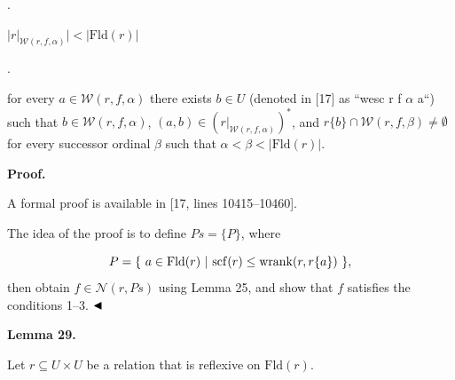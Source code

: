 \documentclass[10pt,a4paper]{amsart}
\begin{document}
 
 
\par{}. 
 
$|r|_{\mathcal{W}(r,f,\alpha)}|<|\mathrm{Fld}(r)|$\par
 
 
 
\par{}. 
 
for every $a\in\mathcal{W}(r,f,\alpha)$ there exists $b\in U$ (denoted in [17] as “wesc r f $\alpha$ a“) such that $b\in\mathcal{W}(r,f,\alpha)$, $(a,b)\in(r|_{\mathcal{W}(r,f,\alpha)})^{*}$, and $r\{b\}\cap\mathcal{W}(r,f,\beta)\neq\emptyset$ for every successor ordinal $\beta$ such that $\alpha<\beta<|\mathrm{Fld}(r)|$.\par
 
 
  
 
 
 
\par\medskip\noindent\textbf{Proof.}\par
 
 
A formal proof is available in [17, lines 10415–10460].\par
 
 
 
The idea of the proof is to define $Ps=\{P\}$, where\par
    \[P=\{\leavevmode\nobreak\ a\in\mathrm{Fld}(r)\leavevmode\nobreak\ |\leavevmode%
\nobreak\ \mathrm{scf}(r)\leq\mathrm{wrank}(r,r\{a\})\leavevmode\nobreak\ \},\]    
then obtain $f\in\mathcal{N}(r,Ps)$ using Lemma 25, and show that $f$ satisfies the conditions 1–3. $\hfill\blacktriangleleft$\par
 
 
 
\par\medskip\noindent\textbf{Lemma 29.}\par
 
 
Let $r\subseteq U\times U$ be a relation that is reflexive on $\mathrm{Fld}(r)$.\par
 
\end{document}
